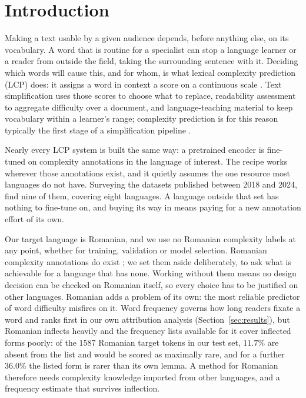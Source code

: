 \section{Introduction}
\label{section:intro}

Making a text usable by a given audience depends, before anything else,
on its vocabulary. A word that is routine for a specialist can stop a
language learner or a reader from outside the field, taking the
surrounding sentence with it. Deciding which
words will cause this, and for whom, is what lexical complexity
prediction (LCP) does: it assigns a word in context a score on a
continuous scale \citep{shardlow-etal-2021-semeval}. Text simplification
uses those scores to choose what to replace, readability assessment to
aggregate difficulty over a document, and language-teaching material to
keep vocabulary within a learner's range; complexity prediction is for
this reason typically the first stage of a simplification pipeline
\citep{qiu-etal-2024-complex}.

Nearly every LCP system is built the same way: a pretrained encoder is
fine-tuned on complexity annotations in the language of interest. The
recipe works wherever those annotations exist, and it quietly assumes the
one resource most languages do not have. Surveying the datasets published
between 2018 and 2024, \citet{shardlow-etal-2024-multilingual} find nine
of them, covering eight languages. A language outside that set has
nothing to fine-tune on, and buying its way in means paying for a new
annotation effort of its own.

Our target language is Romanian, and we use no Romanian complexity
labels at any point, whether for training, validation or model
selection. Romanian complexity annotations do exist
\citep{anghel-etal-2025-rals}; we set them aside deliberately, to ask
what is achievable for a language that has none. Working without them
means no design decision can be checked
on Romanian itself, so every choice has to be justified on other
languages. Romanian adds a problem of its own: the most reliable
predictor of word difficulty misfires on it. Word frequency governs how
long readers fixate a word \citep{rayner1998eye} and ranks first in our
own attribution analysis (Section~\ref{sec:results}), but Romanian
inflects heavily and the frequency lists available for it cover
inflected forms poorly: of the 1587 Romanian target tokens in our test
set, $11.7\%$ are absent from the list and would be scored as maximally
rare, and for a further $36.0\%$ the listed form is rarer than its own
lemma. A method for Romanian therefore needs complexity knowledge
imported from other languages, and a frequency estimate that survives
inflection.

